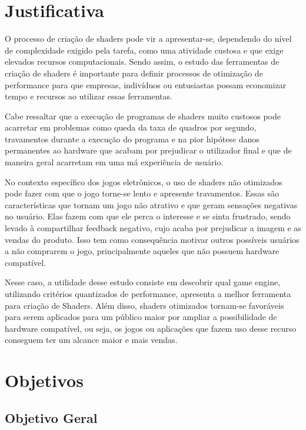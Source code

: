 \section{Justificativa}
\label{sec:justificativa}

O processo de criação de shaders pode vir a apresentar-se, dependendo do nível de complexidade exigido pela tarefa, como uma atividade custosa e que exige elevados recursos computacionais. Sendo assim, o estudo das ferramentas de criação de shaders é importante para definir processos de otimização de performance para que empresas, indivíduos ou entusiastas possam economizar tempo e recursos ao utilizar essas ferramentas. 

Cabe ressaltar que a execução de programas de shaders muito custosos pode acarretar em problemas como queda da taxa de quadros por segundo, travamentos durante a execução do programa e na pior hipótese danos permanentes ao hardware que acabam por prejudicar o utilizador final e que de maneira geral acarretam em uma má experiência de usuário. 

No contexto específico dos jogos eletrônicos, o uso de shaders não otimizados pode fazer com que o jogo torne-se lento e apresente travamentos. Essas são características que tornam um jogo não atrativo e que geram sensações negativas no usuário. Elas fazem com que ele perca o interesse e se sinta frustrado, sendo levado à compartilhar feedback negativo, cujo acaba por prejudicar a imagem e as vendas do produto. Isso tem como consequência motivar outros possíveis usuários a não comprarem o jogo, principalmente aqueles que não possuem hardware compatível.

Nesse caso, a utilidade desse estudo consiste em descobrir qual game engine, utilizando critérios quantizados de performance, apresenta a melhor ferramenta para criação de Shaders. Além disso, shaders otimizados tornam-se favoráveis para serem aplicados para um público maior por ampliar a possibilidade de hardware compatível, ou seja, os jogos ou aplicações que fazem uso desse recurso conseguem ter um alcance maior e mais vendas.


\section{Objetivos}
\label{sec:objetivos}

\subsection{Objetivo Geral}
\label{sec:objetivo-geral}

